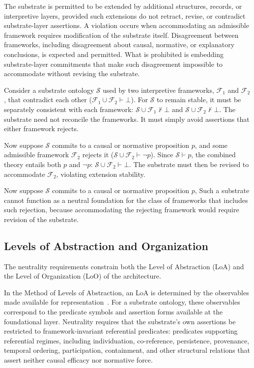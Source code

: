 The substrate is permitted to be extended by additional structures,
records, or interpretive layers, provided such extensions do not retract,
revise, or contradict substrate-layer assertions.
A violation occurs when accommodating an admissible framework
requires modification of the substrate itself.
Disagreement between frameworks, including disagreement about causal,
normative, or explanatory conclusions, is expected and permitted.
What is prohibited is embedding substrate-layer commitments
that make such disagreement impossible to accommodate
without revising the substrate.

Consider a substrate ontology $\mathcal{S}$ used by two interpretive frameworks,
$\mathcal{F}_1$ and $\mathcal{F}_2$, that contradict each other
($\mathcal{F}_1 \cup \mathcal{F}_2 \vdash \bot$).
For $\mathcal{S}$ to remain stable, it must be separately consistent
with each framework:
$\mathcal{S} \cup \mathcal{F}_1 \not\vdash \bot$ and
$\mathcal{S} \cup \mathcal{F}_2 \not\vdash \bot$.
The substrate need not reconcile the frameworks.
It must simply avoid assertions that either framework rejects.

Now suppose $\mathcal{S}$ commits to a causal or normative proposition $p$,
and some admissible framework $\mathcal{F}_2$ rejects it
($\mathcal{S} \cup \mathcal{F}_2 \vdash \neg p$).
Since $\mathcal{S} \vdash p$,
the combined theory entails both $p$ and $\neg p$:
$\mathcal{S} \cup \mathcal{F}_2 \vdash \bot$.
The substrate must then be revised to accommodate
$\mathcal{F}_2$, violating extension stability.

Now suppose $\mathcal{S}$ commits to a causal or normative proposition $p$,
Such a substrate cannot function as a neutral foundation
for the class of frameworks that includes such rejection,
because accommodating the rejecting framework would require
revision of the substrate.

\subsection{Levels of Abstraction and Organization}
\label{subsec:loas-and-loos}

The neutrality requirements constrain both the
Level of Abstraction (LoA) and the
Level of Organization (LoO) of the architecture.

In the Method of Levels of Abstraction,
an LoA is determined by the observables made available
for representation~\citep{floridi2008levels,floridi2011philosophy}.
For a substrate ontology, these observables correspond
to the predicate symbols and assertion forms available
at the foundational layer.
Neutrality requires that the substrate's own assertions
be restricted to framework-invariant referential predicates:
predicates supporting referential regimes,
including individuation, co-reference, persistence,
provenance, temporal ordering, participation,
containment, and other structural relations
that assert neither causal efficacy nor normative force.

